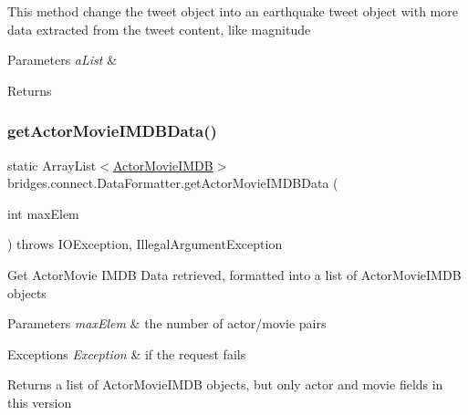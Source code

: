 This method change the tweet object into an earthquake tweet object with more data extracted from the tweet content, like magnitude 
\begin{DoxyParams}{Parameters}
{\em a\+List} & \\
\hline
\end{DoxyParams}
\begin{DoxyReturn}{Returns}

\end{DoxyReturn}
\mbox{\label{classbridges_1_1connect_1_1_data_formatter_aa2a84fe044615b2e1b166d412babac0f}} 
\subsubsection{\texorpdfstring{get\+Actor\+Movie\+I\+M\+D\+B\+Data()}{getActorMovieIMDBData()}}
{\footnotesize\ttfamily static Array\+List$<$\hyperlink{classbridges_1_1data__src__dependent_1_1_actor_movie_i_m_d_b}{Actor\+Movie\+I\+M\+DB}$>$ bridges.\+connect.\+Data\+Formatter.\+get\+Actor\+Movie\+I\+M\+D\+B\+Data (\begin{DoxyParamCaption}\item[{int}]{max\+Elem }\end{DoxyParamCaption}) throws I\+O\+Exception, Illegal\+Argument\+Exception\hspace{0.3cm}{\ttfamily [static]}}

Get Actor\+Movie I\+M\+DB Data retrieved, formatted into a list of Actor\+Movie\+I\+M\+DB objects


\begin{DoxyParams}{Parameters}
{\em max\+Elem} & the number of actor/movie pairs \\
\hline
\end{DoxyParams}

\begin{DoxyExceptions}{Exceptions}
{\em Exception} & if the request fails\\
\hline
\end{DoxyExceptions}
\begin{DoxyReturn}{Returns}
a list of Actor\+Movie\+I\+M\+DB objects, but only actor and movie fields in this version 
\end{DoxyReturn}
\mbox{\label{classbridges_1_1connect_1_1_data_formatter_a9b599616c4d7a502f9fab8663173db6d}} 
